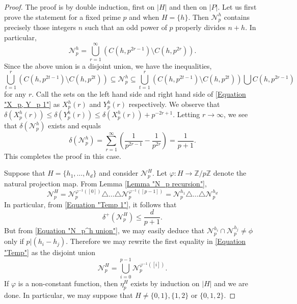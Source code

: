 \documentclass[10pt,a4paper]{amsart}
\newcommand{\Z}{\mathbb{Z}}
\begin{document}
	\begin{proof}
		The proof is by double induction, first on $|H|$ and then on $|P|$. Let us first prove the statement for a fixed prime $p$ and when $H=\{h\}$. Then $\mathcal{N}_p^h$ contains precisely those integers $n$ such that an odd power of $p$ properly divides $n+h$. In particular,
		\begin{equation}\label{Equation "N_p^h union"}
			\mathcal{N}_p^h = \bigcup_{r=1}^{\infty} \left(C(h, p^{2r-1})\setminus C(h, p^{2r})\right).
		\end{equation}
		Since the above union is a disjoint union, we have the inequalities,
		\begin{equation}\label{Equation "X_p, Y_p 1"}
			\bigcup_{t=1}^{r} \left(C(h, p^{2t-1})\setminus C(h, p^{2t})\right) \subseteq \mathcal{N}_p^h \subseteq \bigcup_{t=1}^{r}\left( C(h, p^{2t-1})\setminus C(h, p^{2t})\right) \bigcup C(h, p^{2r-1})
		\end{equation}
		for any $r$. Call the sets on the left hand side and right hand side of \eqref{Equation "X_p, Y_p 1"} as $X_p^h(r)$ and $Y_p^h(r)$ respectively. We observe that $\delta(X_p^h(r))\leqslant \delta(Y_p^h(r))\leqslant \delta(X_p^h(r)) + p^{-2r+1}$. Letting $r\to\infty$, we see that $\delta(\mathcal{N}_p^h)$ exists and equals
		\begin{equation}\label{Equation "Temp 1"}
			\delta\left(\mathcal{N}_p^h\right) = \sum_{r=1}^{\infty} \left(\frac{1}{p^{2r-1}} - \frac{1}{p^{2r}}\right)= \frac{1}{p+1}.
		\end{equation}
		This completes the proof in this case.
		
		Suppose that $H= \{h_1,\ldots,h_d\}$ and consider $\mathcal{N}_p^H$. Let $\varphi : H\to \Z/p\Z$ denote the natural projection map. From Lemma \ref{Lemma "N_p recursion"},
		\begin{equation}\label{Equation "Temp"}
			\mathcal{N}_p^H =  \mathcal{N}_p^{\varphi^{-1}([0])}\triangle\ldots \triangle \mathcal{N}_p^{\varphi^{-1}([p-1])} = \mathcal{N}_p^{h_1}\triangle\ldots \triangle \mathcal{N}_p^{h_d}
		\end{equation}
		In particular, from \eqref{Equation "Temp 1"}, it follows that 
		\begin{equation}\label{Equation "eta_p evaluation"}
			\delta^+\left(\mathcal{N}_p^H\right)\leqslant \frac{d}{p+1}.
		\end{equation}
		But from \eqref{Equation "N_p^h union"}, we may easily deduce that $\mathcal{N}_p^{h_i}\cap \mathcal{N}_p^{h_j}\neq \phi$ only if $p| (h_i-h_j)$. Therefore we may rewrite the first equality in \eqref{Equation "Temp"} as the disjoint union
		\begin{equation}\label{Equation "Disjoint union"}
			\mathcal{N}_p^H = \bigcup_{i=0}^{p-1} \mathcal{N}_p^{\varphi^{-1}([i])}.
		\end{equation}
		If $\varphi$ is a non-constant function, then $\eta_p^H$ exists by induction on $|H|$ and we are done. In particular, we may suppose that $H\neq \{0,1\},\{1,2\}$ or $\{0,1,2\}$. 
		

\end{proof}
\end{document}
